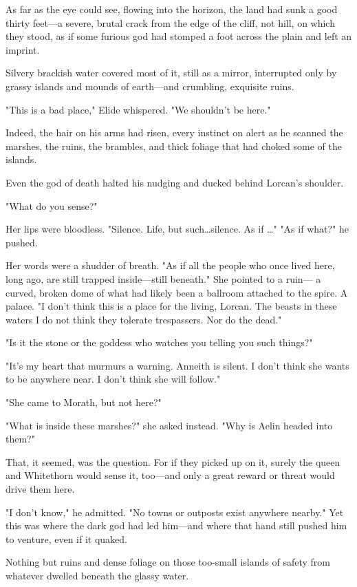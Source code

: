 As far as the eye could see, flowing into the horizon, the land had sunk a good thirty feet---a severe, brutal crack from the edge of the cliff, not hill, on which they stood, as if some furious god had stomped a foot across the plain and left an imprint.

Silvery brackish water covered most of it, still as a mirror, interrupted only by grassy islands and mounds of earth---and crumbling, exquisite ruins.

"This is a bad place," Elide whispered.
"We shouldn't be here."

Indeed, the hair on his arms had risen, every instinct on alert as he scanned the marshes, the ruins, the brambles, and thick foliage that had choked some of the islands.

Even the god of death halted his nudging and ducked behind Lorcan's shoulder.

"What do you sense?"

Her lips were bloodless.
"Silence.
Life, but such\ldots silence.
As if \ldots" "As if what?"
he pushed.

Her words were a shudder of breath.
"As if all the people who once lived here, long ago, are still trapped inside---still 
beneath."
She pointed to a ruin--- a curved, broken dome of what had likely been a ballroom attached to the spire.
A palace.
"I don't think this is a place for the living, Lorcan.
The beasts in these waters  I do not think they tolerate trespassers.
Nor do the dead."

"Is it the stone or the goddess who watches you telling you such things?"

"It's my heart that murmurs a warning.
Anneith is silent.
I don't think she wants to be anywhere near.
I don't think she will follow."

"She came to Morath, but not here?"

"What is inside these marshes?"
she asked instead.
"Why is Aelin headed into them?"

That, it seemed, was the question.
For if they picked up on it, surely the queen and Whitethorn would sense it, too---and only a great reward or threat would drive them here.

"I don't know," he admitted.
"No towns or outposts exist anywhere nearby."
Yet this was where the dark god had led him---and where that hand still pushed him to venture, even if it quaked.

Nothing but ruins and dense foliage on those too-small islands of safety from whatever dwelled beneath the glassy water.

